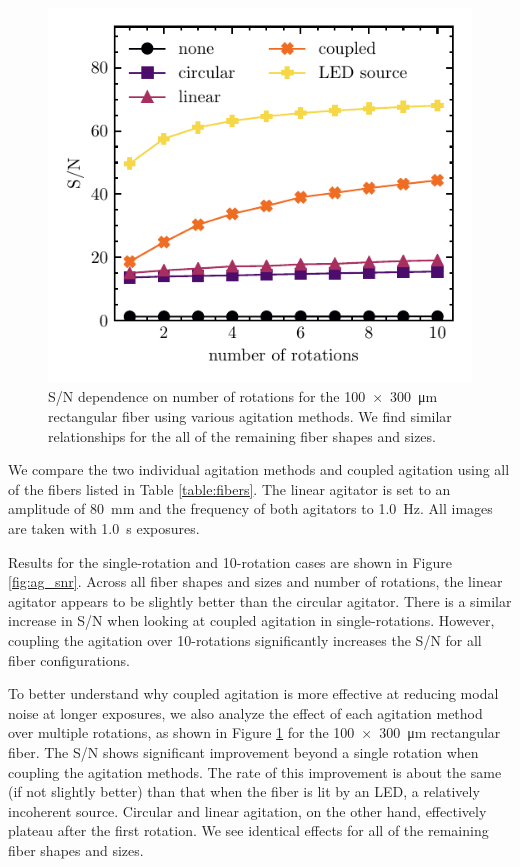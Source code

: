 \begin{figure}
\centering
	\includegraphics[width=\columnwidth]{figures-2/rect_snr_vs_time.pdf}
	\caption{S/N dependence on number of rotations for the \SI{100x300}{\micro\meter} rectangular fiber using various agitation methods. We find similar relationships for the all of the remaining fiber shapes and sizes.}
\label{fig:rect_snr_vs_time}
\end{figure}

We compare the two individual agitation methods and coupled agitation using all of the fibers listed in Table \ref{table:fibers}. The linear agitator is set to an amplitude of \SI{80}{\milli\meter} and the frequency of both agitators to \SI{1.0}{\hertz}. All images are taken with \SI{1.0}{\second} exposures.

Results for the single-rotation and 10-rotation cases are shown in Figure \ref{fig:ag_snr}. Across all fiber shapes and sizes and number of rotations, the linear agitator appears to be slightly better than the circular agitator. There is a similar increase in S/N when looking at coupled agitation in single-rotations. However, coupling the agitation over 10-rotations significantly increases the S/N for all fiber configurations.

To better understand why coupled agitation is more effective at reducing modal noise at longer exposures, we also analyze the effect of each agitation method over multiple rotations, as shown in Figure \ref{fig:rect_snr_vs_time} for the \SI{100x300}{\micro\meter} rectangular fiber. The S/N shows significant improvement beyond a single rotation when coupling the agitation methods. The rate of this improvement is about the same (if not slightly better) than that when the fiber is lit by an LED, a relatively incoherent source. Circular and linear agitation, on the other hand, effectively plateau after the first rotation. We see identical effects for all of the remaining fiber shapes and sizes.

